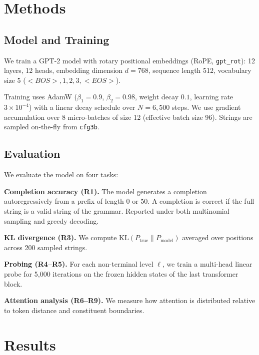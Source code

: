\documentclass[10pt,twocolumn]{article}
\begin{document}
\section{Methods}
\label{sec:methods}

\subsection{Model and Training}

We train a GPT-2 model \citep{radford2019gpt2} with rotary positional embeddings (RoPE, \texttt{gpt\_rot}): 12 layers, 12 heads, embedding dimension $d = 768$, sequence length 512, vocabulary size 5 ($<BOS>, 1, 2, 3, <EOS>$).

Training uses AdamW ($\beta_1{=}0.9$, $\beta_2{=}0.98$, weight decay $0.1$, learning rate $3{\times}10^{-4}$) with a linear decay schedule over $N{=}6{,}500$ steps. We use gradient accumulation over 8 micro-batches of size 12 (effective batch size 96). Strings are sampled on-the-fly from \texttt{cfg3b}.

\subsection{Evaluation}

We evaluate the model on four tasks:

\textbf{Completion accuracy (R1).} The model generates a completion autoregressively from a prefix of length 0 or 50. A completion is correct if the full string is a valid string of the grammar. Reported under both multinomial sampling and greedy decoding.

\textbf{KL divergence (R3).} We compute $\text{KL}(P_{\text{true}} \| P_{\text{model}})$ averaged over positions across 200 sampled strings.

\textbf{Probing (R4--R5).} For each non-terminal level $\ell$, we train a multi-head linear probe for 5{,}000 iterations on the frozen hidden states of the last transformer block.

\textbf{Attention analysis (R6--R9).} We measure how attention is distributed relative to token distance and constituent boundaries.

\section{Results}
\label{sec:results}
\end{document}
